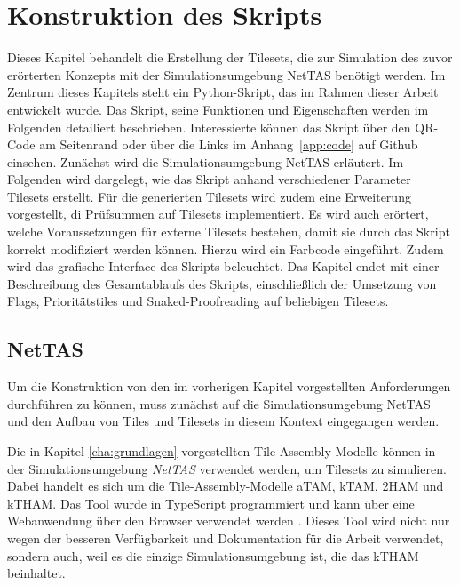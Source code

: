 \chapter{Konstruktion des Skripts}
\label{cha:konstruktion}

Dieses Kapitel behandelt die Erstellung der Tilesets, die zur Simulation des zuvor erörterten Konzepts mit der Simulationsumgebung NetTAS benötigt werden. Im Zentrum dieses Kapitels steht ein Python-Skript, das im Rahmen dieser Arbeit entwickelt wurde. Das Skript, seine Funktionen und Eigenschaften werden im Folgenden detailiert beschrieben. Interessierte können das Skript über den QR-Code am Seitenrand  oder über die Links im Anhang~\ref{app:code} auf Github einsehen. Zunächst wird die Simulationsumgebung NetTAS erläutert. Im Folgenden wird dargelegt, wie das Skript anhand verschiedener Parameter Tilesets erstellt. Für die generierten Tilesets wird zudem eine Erweiterung vorgestellt, di Prüfsummen auf Tilesets implementiert. Es wird auch erörtert, welche Voraussetzungen für externe Tilesets bestehen, damit sie durch das Skript korrekt modifiziert werden können. Hierzu wird ein Farbcode eingeführt. Zudem wird das grafische Interface des Skripts beleuchtet. Das Kapitel endet mit einer Beschreibung des Gesamtablaufs des Skripts, einschließlich der Umsetzung von Flags, Prioritätstiles und Snaked-Proofreading auf beliebigen Tilesets.

\section{NetTAS}

Um die Konstruktion von den im vorherigen Kapitel vorgestellten Anforderungen durchführen zu können, muss zunächst auf die Simulationsumgebung NetTAS und den Aufbau von Tiles und Tilesets in diesem Kontext eingegangen werden.

Die in Kapitel \ref{cha:grundlagen} vorgestellten Tile-Assembly-Modelle können in der Simulationsumgebung \emph{NetTAS} verwendet werden, um Tilesets zu simulieren. Dabei handelt es sich um die Tile-Assembly-Modelle aTAM, kTAM, 2HAM und kTHAM. Das Tool wurde in TypeScript programmiert und kann über eine Webanwendung über den Browser verwendet werden \cite{kaussow2022thesis}. Dieses Tool wird nicht nur wegen der besseren Verfügbarkeit und Dokumentation für die Arbeit verwendet, sondern auch, weil es die einzige Simulationsumgebung ist, die das kTHAM beinhaltet.

